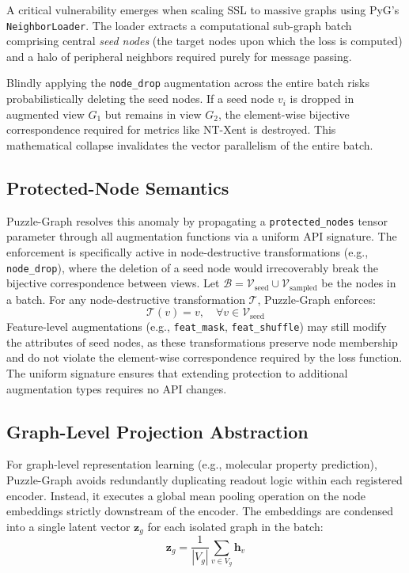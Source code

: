 \documentclass[conference]{IEEEtran}
\begin{document}
A critical vulnerability emerges when scaling SSL to massive graphs using PyG's \texttt{NeighborLoader}. The loader extracts a computational sub-graph batch comprising central \textit{seed nodes} (the target nodes upon which the loss is computed) and a halo of peripheral neighbors required purely for message passing.

Blindly applying the \texttt{node\_drop} augmentation across the entire batch risks probabilistically deleting the seed nodes. If a seed node $v_i$ is dropped in augmented view $G_1$ but remains in view $G_2$, the element-wise bijective correspondence required for metrics like NT-Xent is destroyed. This mathematical collapse invalidates the vector parallelism of the entire batch.

\subsection{Protected-Node Semantics}
Puzzle-Graph resolves this anomaly by propagating a \texttt{protected\_nodes} tensor parameter through all augmentation functions via a uniform API signature. The enforcement is specifically active in node-destructive transformations (e.g., \texttt{node\_drop}), where the deletion of a seed node would irrecoverably break the bijective correspondence between views. Let $\mathcal{B} = \mathcal{V}_{\text{seed}} \cup \mathcal{V}_{\text{sampled}}$ be the nodes in a batch. For any node-destructive transformation $\mathcal{T}$, Puzzle-Graph enforces:
\begin{equation}
\mathcal{T}(v) = v, \quad \forall v \in \mathcal{V}_{\text{seed}}
\end{equation}
Feature-level augmentations (e.g., \texttt{feat\_mask}, \texttt{feat\_shuffle}) may still modify the attributes of seed nodes, as these transformations preserve node membership and do not violate the element-wise correspondence required by the loss function. The uniform signature ensures that extending protection to additional augmentation types requires no API changes.

\subsection{Graph-Level Projection Abstraction}
For graph-level representation learning (e.g., molecular property prediction), Puzzle-Graph avoids redundantly duplicating readout logic within each registered encoder. Instead, it executes a global mean pooling operation on the node embeddings strictly downstream of the encoder. The embeddings are condensed into a single latent vector $\bm{z}_g$ for each isolated graph in the batch:
\begin{equation}
\bm{z}_g = \frac{1}{|V_g|} \sum_{v \in V_g} \bm{h}_v
\end{equation}
\end{document}
